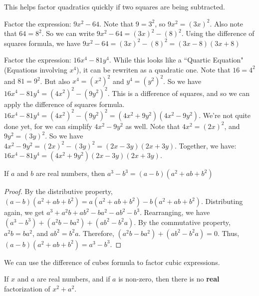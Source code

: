 \documentclass[crop=false,class=book,oneside]{standalone}
\begin{document}
            \begin{remark}
            This helps factor quadratics quickly if two squares are being subtracted.
            \end{remark}
            \begin{example}
            Factor the expression: $9x^{2}-64$. Note that $9=3^{2}$, so $9x^{2}=(3x)^{2}$. Also note that $64=8^{2}$. So we can write $9x^{2}-64=(3x)^{2}-(8)^{2}$. Using the difference of squares formula, we have $9x^{2}-64=(3x)^{2}-(8)^{2}=(3x-8)(3x+8)$
            \end{example}
            \begin{example}
            Factor the expression: $16x^{4}-81y^{4}$. While this looks like a ``Quartic Equation" (Equations involving $x^4$), it can be rewriten as a quadratic one. Note that $16=4^{2}$ and $81=9^{2}$. But also $x^{4}=(x^{2})^{2}$ and $y^{4}=(y^{2})^{2}$. So we have $16x^{4}-81y^{4}=(4x^{2})^{2}-(9y^{2})^{2}$. This is a difference of squares, and so we can apply the difference of squares formula. $16x^{4}-81y^{4}=(4x^{2})^{2}-(9y^{2})^{2}=(4x^{2}+9y^{2})(4x^{2}-9y^{2})$. We're not quite done yet, for we can simplify $4x^{2}-9y^{2}$ as well. Note that $4x^{2}=(2x)^{2}$, and $9y^{2}=(3y)^{2}$. So we have $4x^{2}-9y^{2}=(2x)^{2}-(3y)^{2}=(2x-3y)(2x+3y)$. Together, we have: $16x^{4}-81y^{4}=(4x^{2}+9y^{2})(2x-3y)(2x+3y)$.
            \end{example}
            \begin{theorem}
            \label{theorem:north_shore_difference_of_cubes}
            If $a$ and $b$ are real numbers, then $a^{3}-b^{3}=(a-b)(a^{2}+ab+b^{2})$
            \end{theorem}
            \begin{proof}
            By the distributive property, $(a-b)(a^{2}+ab+b^{2})=a(a^{2}+ab+b^{2})-b(a^{2}+ab+b^{2})$. Distributing again, we get $a^{3}+a^{2}b+ab^{2}-ba^{2}-ab^{2}-b^{3}$. Rearranging, we have $(a^{3}-b^{3})+(a^{2}b-ba^{2})+(ab^{2}-b^{2}a)$. By the commutative property, $a^{2}b=ba^{2}$, and $ab^{2}=b^{2}a$. Therefore, $(a^{2}b-ba^{2})+(ab^{2}-b^{2}a)=0$. Thus, $(a-b)(a^{2}+ab+b^{2})=a^{3}-b^{3}$.
            \end{proof}
            \begin{remark}
            We can use the difference of cubes formula to factor cubic expressions.
            \end{remark}
            \begin{theorem}
            \label{theorem:north_shore_sum_of_squares}
            If $x$ and $a$ are real numbers, and if $a$ is non-zero, then there is no \textbf{real} factorization of $x^{2}+a^{2}$.
            \end{theorem}
\end{document}
